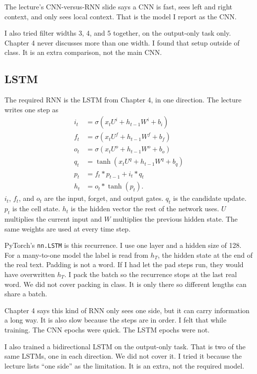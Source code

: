 \documentclass[11pt]{article}
\begin{document}
The lecture's CNN-versus-RNN slide says a CNN is fast, sees left and right context, and only sees local context. That is the model I report as the CNN.

I also tried filter widths 3, 4, and 5 together, on the output-only task only. Chapter 4 never discusses more than one width. I found that setup outside of class. It is an extra comparison, not the main CNN.

\subsection{LSTM}

The required RNN is the LSTM from Chapter 4, in one direction. The lecture writes one step as
\begin{align*}
i_t &= \sigma(x_t U^{i} + h_{t-1} W^{i} + b_i) \\
f_t &= \sigma(x_t U^{f} + h_{t-1} W^{f} + b_f) \\
o_t &= \sigma(x_t U^{o} + h_{t-1} W^{o} + b_o) \\
q_t &= \tanh(x_t U^{q} + h_{t-1} W^{q} + b_q) \\
p_t &= f_t * p_{t-1} + i_t * q_t \\
h_t &= o_t * \tanh(p_t).
\end{align*}
$i_t$, $f_t$, and $o_t$ are the input, forget, and output gates. $q_t$ is the candidate update. $p_t$ is the cell state. $h_t$ is the hidden vector the rest of the network uses. $U$ multiplies the current input and $W$ multiplies the previous hidden state. The same weights are used at every time step.

PyTorch's \texttt{nn.LSTM} is this recurrence. I use one layer and a hidden size of 128. For a many-to-one model the label is read from $h_T$, the hidden state at the end of the real text. Padding is not a word. If I had let the pad steps run, they would have overwritten $h_T$. I pack the batch so the recurrence stops at the last real word. We did not cover packing in class. It is only there so different lengths can share a batch.

Chapter 4 says this kind of RNN only sees one side, but it can carry information a long way. It is also slow because the steps are in order. I felt that while training. The CNN epochs were quick. The LSTM epochs were not.

I also trained a bidirectional LSTM on the output-only task. That is two of the same LSTMs, one in each direction. We did not cover it. I tried it because the lecture lists ``one side'' as the limitation. It is an extra, not the required model.
\end{document}

